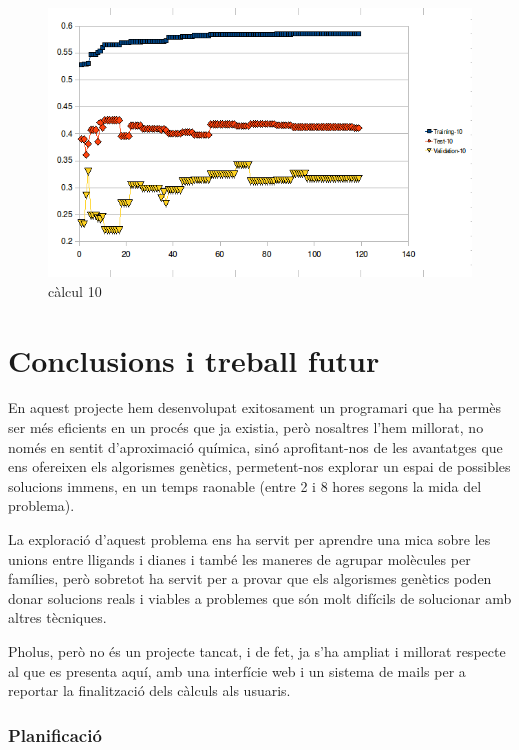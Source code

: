 \begin{figure}[h]
\begin{center}
\includegraphics[scale=0.75]{pholus/pholus10.png}
\end{center}
\caption{càlcul 10}
\label{fig:pholusResult10}
\end{figure}

\section{Conclusions i treball futur} %
\label{sec:PConclusions i treball futur}
En aquest projecte hem desenvolupat exitosament un programari que ha permès ser
més eficients en un procés que ja existia, però nosaltres l'hem millorat, no
només en sentit d'aproximació química, sinó aprofitant-nos de les avantatges que
ens ofereixen els algorismes genètics, permetent-nos explorar un espai de
possibles solucions immens, en un temps raonable (entre 2 i 8 hores segons la
mida del problema).

La exploració d'aquest problema ens ha servit per aprendre una mica sobre
les unions entre lligands i dianes i també les maneres de agrupar molècules per
famílies, però sobretot ha servit per a provar que els algorismes genètics poden
donar solucions reals i viables a problemes que són molt difícils de solucionar
amb altres tècniques.

Pholus, però no és un projecte tancat, i de fet, ja s'ha ampliat i millorat
respecte al que es presenta aquí, amb una interfície web i un sistema de mails
per a reportar la finalització dels càlculs als usuaris.

\subsubsection{Planificació} %
\label{ssub:Plan}

